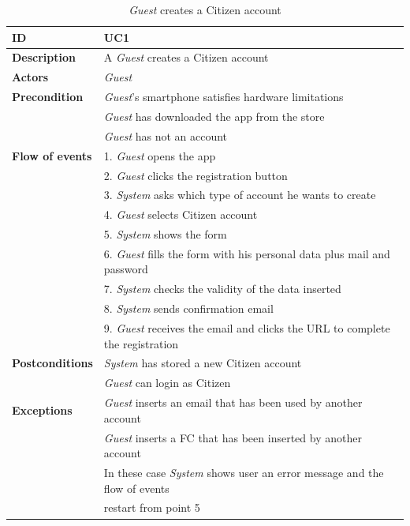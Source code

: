 \documentclass{article}
\begin{document}
\begin{table}
    \begin{center}
    \centering
\begin{tabular}{ | l | l |}
\hline
\textbf{ID} & UC1 \\
\hline
\textbf{Description} & A \textit{Guest} creates a Citizen account \\
\hline
\textbf{Actors} & \textit{Guest} \\
\hline
\textbf{Precondition} & \textit{Guest}'s smartphone satisfies hardware limitations \\
             & \textit{Guest} has downloaded the app from the store \\
             & \textit{Guest} has not an account\\ 
\hline
\textbf{Flow of events} & 1. \textit{Guest} opens the app \\
                        & 2. \textit{Guest} clicks the registration button \\
                        & 3. \textit{System} asks which type of account he wants to create \\
                        & 4. \textit{Guest} selects Citizen account \\
                        & 5. \textit{System} shows the form \\
                        & 6. \textit{Guest} fills the form with his personal data plus mail and password \\
                        & 7. \textit{System} checks the validity of the data inserted \\
                        & 8. \textit{System} sends confirmation email \\
                        & 9. \textit{Guest} receives the email and clicks the URL to complete the registration \\  
\hline
\textbf{Postconditions} & \textit{System} has stored a new Citizen account  \\
                        & \textit{Guest} can login as Citizen \\
\hline
\textbf{Exceptions} & \textit{Guest} inserts an email that has been used by another account \\
                    & \textit{Guest} inserts a FC that has been inserted by another account \\
                    & In these case \textit{System} shows user an error message and the flow of events  \\
                    & restart from point 5 \\  
\hline
\end{tabular}
\caption{\textit{Guest} creates a Citizen account}
\end{center}
\end{table}
\end{document}
